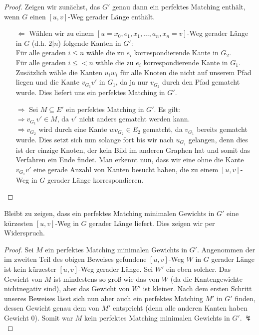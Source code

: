 \documentclass[a4paper,10pt,german]{scrartcl}
\newcommand{\ra}{\Rightarrow}
\begin{document}
\begin{proof}
Zeigen wir zunächst, das $G'$ genau dann ein perfektes Matching enthält, wenn $G$ einen $[u,v]$-Weg gerader Länge enthält.
  \begin{itemize}
  \item[$\Leftarrow$] Wählen wir zu einem $[u=x_0,e_1,x_1,\dots,a_n,x_n=v]$-Weg gerader 
    Länge in $G$ (d.h. $2|n$) folgende Kanten in $G'$:\\
    Für alle geraden $i\leq n$ wähle die zu $e_i$ korrespondierende Kante in $G_2$.\\
    Für alle geraden $i\leq< n$ wähle die zu $e_i$ korrespondierende Kante in $G_1$.\\
    Zusätzlich wähle die Kanten $u_iw_i$ für alle Knoten die nicht auf unserem Pfad liegen
    und die Kante $v_{G_1}v'$ in $G_1$, da ja nur $v_{G_2}$ durch den Pfad gematcht wurde.
    Dies liefert uns ein perfektes Matching in $G'$.
  \item[$\ra$]Sei $M\subseteq E'$ ein perfektes Matching in $G'$. Es gilt:\\
    $\ra v_{G_1}v'\in M$, da $v'$ nicht anders gematcht werden kann.\\
    $\ra v_{G_2}$ wird durch eine Kante $wv_{G_2}\in E_2$ gematcht, da $v_{G_1}$ bereits
    gematcht wurde.
    Dies setzt sich nun solange fort bis wir nach $u_{G_1}$ gelangen, denn dies ist der 
    einzige Knoten, der kein Bild im anderen Graphen hat und somit das Verfahren ein Ende 
    findet. Man erkennt nun, dass wir eine ohne die Kante $v_{G_1}v'$ eine gerade Anzahl von 
    Kanten besucht haben, die zu einem $[u,v]$-Weg in $G$ gerader Länge korrespondieren.         
  \end{itemize}
\end{proof}
Bleibt zu zeigen, dass ein perfektes Matching minimalen Gewichts in $G'$ eine kürzesten $[u,v]$-Weg in $G$ gerader Länge liefert. Dies zeigen wir per Widerspruch.
\begin{proof} Sei $M$ ein perfektes Matching minimalen Gewichts in $G'$. Angenommen der im zweiten Teil des obigen Beweises gefundene $[u,v]$-Weg $W$ in $G$ gerader Länge ist kein kürzester $[u,v]$-Weg gerader Länge. Sei $W'$ ein eben solcher. Das Gewicht von $M$ ist mindestens so groß wie das von $W$ (da die Kantengewichte nichtnegativ sind), aber das Gewicht von $W'$ ist kleiner. Nach dem ersten Schritt unseres Beweises lässt sich nun aber auch ein perfektes Matching $M'$ in $G'$ finden, dessen Gewicht genau dem von $M'$ entspricht (denn alle anderen Kanten haben Gewicht 0). Somit war $M$ kein perfektes Matching minimalen Gewichts in $G'.\ \lightning$
\end{proof}
\end{document}
